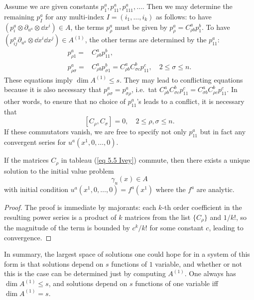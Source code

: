 \begin{example}
Assume we are given constants $p_1^a,p_{11}^a,p^a_{111},\ldots $. Then we may determine the remaining $p^a_I$ for any multi-index $I=(i_1,\ldots,i_k)$ as follows: to have $(p^a_i\otimes \partial_{u^a}\otimes \dd x^i)\in A$, the terms $p^a_\rho$ must be given by $p^a_\rho=C^a_{\rho b}p^b_1$. To have $(p^a_{ij}\partial_{u^a}\otimes \dd x^i\dd x^j)\in A^{(1)}$, the other terms are determined by the $p^a_{11}$:
\begin{align}
    p^a_{\rho 1}=&C^a_{\rho b}p^b_{11},\\
    p^a_{\rho\sigma}=&C^a_{\rho b}p^b_{\sigma 1}=C^a_{\rho b}C^b_{\sigma c}p^c_{11},\quad 2\leq \sigma\leq n.
\end{align}
These equations imply $\dim A^{(1)}\leq s$. They may lead to conflicting equations because it is also necessary that $p^a_{\rho\sigma}=p^a_{\sigma\rho}$, i.e.\ tat $C^a_{\rho b}C^b_{\sigma c}p^c_{11}=C^a_{\sigma b}C^b_{\rho c}p^c_{11}$. In other words, to ensure that no choice of $p^a_{11}$'s leads to a conflict, it is necessary that 
\[[C_\rho,C_\sigma]=0,\quad 2\leq \rho,\sigma\leq n.\]
If these commutators vanish, we are free to specify not only $p^a_{11}$ but in fact any convergent series for $u^a(x^1,0,\ldots,0)$.
\begin{prop}
    If the matrices $C_\rho$ in tableau (\ref{eq 5.5 Ivey}) commute, then there exists a unique solution to the initial value problem 
    \[\gamma_u(x)\in A\]
    with initial condition $u^a(x^1,0,\ldots,0)=f^a(x^1)$ where the $f^a$ are analytic.
\end{prop}
\begin{proof}
    The proof is immediate by majorants: each $k$-th order coefficient in the resulting power series is a product of $k$ matrices from the list $\{C_\rho\}$ and $1/k!$, so the magnitude of the term is bounded by $c^k/k!$ for some constant $c$, leading to convergence.
\end{proof}

In summary, the largest space of solutions one could hope for in a system of this form is that solutions depend on $s$ functions of $1$ variable, and whether or not this is the case can be determined just by computing $A^{(1)}$. One always has $\dim A^{(1)}\leq s$, and solutions depend on $s$ functions of one variable iff $\dim A^{(1)}=s$.
\end{example}

